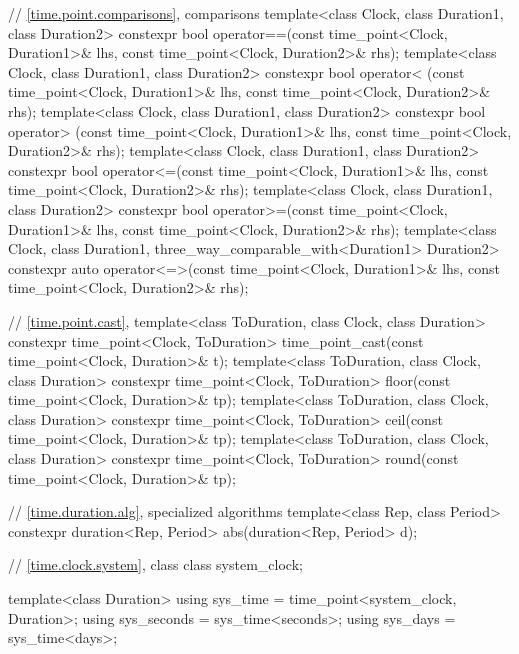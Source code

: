 \begin{codeblock}
{{    // \ref{time.point.comparisons},  comparisons
    template<class Clock, class Duration1, class Duration2>
       constexpr bool operator==(const time_point<Clock, Duration1>& lhs,
                                 const time_point<Clock, Duration2>& rhs);
    template<class Clock, class Duration1, class Duration2>
       constexpr bool operator< (const time_point<Clock, Duration1>& lhs,
                                 const time_point<Clock, Duration2>& rhs);
    template<class Clock, class Duration1, class Duration2>
       constexpr bool operator> (const time_point<Clock, Duration1>& lhs,
                                 const time_point<Clock, Duration2>& rhs);
    template<class Clock, class Duration1, class Duration2>
       constexpr bool operator<=(const time_point<Clock, Duration1>& lhs,
                                 const time_point<Clock, Duration2>& rhs);
    template<class Clock, class Duration1, class Duration2>
       constexpr bool operator>=(const time_point<Clock, Duration1>& lhs,
                                 const time_point<Clock, Duration2>& rhs);
    template<class Clock, class Duration1, three_way_comparable_with<Duration1> Duration2>
       constexpr auto operator<=>(const time_point<Clock, Duration1>& lhs,
                                  const time_point<Clock, Duration2>& rhs);

    // \ref{time.point.cast}, 
    template<class ToDuration, class Clock, class Duration>
      constexpr time_point<Clock, ToDuration>
        time_point_cast(const time_point<Clock, Duration>& t);
    template<class ToDuration, class Clock, class Duration>
      constexpr time_point<Clock, ToDuration> floor(const time_point<Clock, Duration>& tp);
    template<class ToDuration, class Clock, class Duration>
      constexpr time_point<Clock, ToDuration> ceil(const time_point<Clock, Duration>& tp);
    template<class ToDuration, class Clock, class Duration>
      constexpr time_point<Clock, ToDuration> round(const time_point<Clock, Duration>& tp);

    // \ref{time.duration.alg}, specialized algorithms
    template<class Rep, class Period>
      constexpr duration<Rep, Period> abs(duration<Rep, Period> d);

    // \ref{time.clock.system}, class 
    class system_clock;

    template<class Duration>
      using sys_time  = time_point<system_clock, Duration>;
    using sys_seconds = sys_time<seconds>;
    using sys_days    = sys_time<days>;

}}
\end{codeblock}
